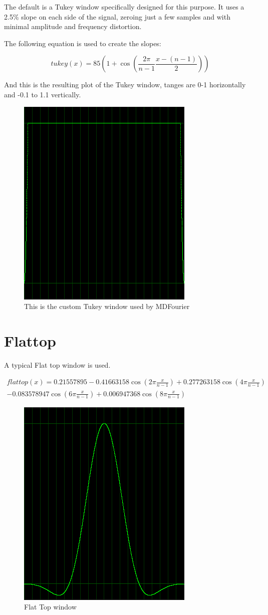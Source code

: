 \documentclass[10pt,a4paper]{report}
\begin{document}
\begin{appendices}
The default is a Tukey window specifically designed for this purpose. It uses a 2.5\% slope on each side of the signal, zeroing just a few samples and with minimal amplitude and frequency distortion.

The following equation is used to create the slopes:

\begin{equation}
tukey(x)=85(1+\cos(\frac{2\pi}{n-1}\frac{x-(n-1)}{2}))
\end{equation}

And this is the resulting plot of the Tukey window, tanges are 0-1 horizontally and -0.1 to 1.1 vertically.

\begin{figure}[H]
	\centering
	\includegraphics[width=0.4\linewidth]{plots/window-tukey.png}
	\caption[Tukey Window]{This is the custom Tukey window used by MDFourier}
	\label{fig:window-tukey}
\end{figure}

\newpage
\section{Flattop}
A typical Flat top window is used.

\begin{align*}
flattop(x)=0.21557895 - 0.41663158\cos(2\pi\frac{x}{n-1})+ 0.277263158\cos(4\pi\frac{x}{n-1})\\
- 0.083578947\cos(6\pi\frac{x}{n-1}) + 0.006947368\cos(8\pi\frac{x}{n-1})
\end{align*}

\begin{figure}[H]
	\centering
	\includegraphics[width=0.4\linewidth]{plots/window-flattop.png}
	\caption[Flat Top window]{Flat Top window}
	\label{fig:window-flattop}
\end{figure}


\end{appendices}
\end{document}
